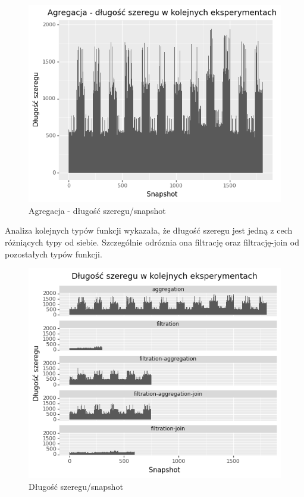\begin{figure}[H]
    \centering
    \captionsetup{justification=centering,margin=0.5cm}
    \includegraphics[scale=0.9]{figures/04-opis-danych/data-analysis/AgregacjaDlgSzereguNaSnapshot.png}
    \caption{Agregacja - długość szeregu/snapshot}
    \label{fig:scr46}
\end{figure}
Analiza kolejnych typów funkcji wykazała, że długość szeregu jest jedną z cech różniących typy od siebie. Szczególnie odróznia ona filtrację oraz filtrację-join od pozostałych typów funkcji.
\begin{figure}[H]
    \centering
    \captionsetup{justification=centering,margin=0.5cm}
    \includegraphics[scale=1.0]{figures/04-opis-danych/data-analysis/all_count.png}
    \caption{Długość szeregu/snapshot}
    \label{fig:scr46}
\end{figure}
